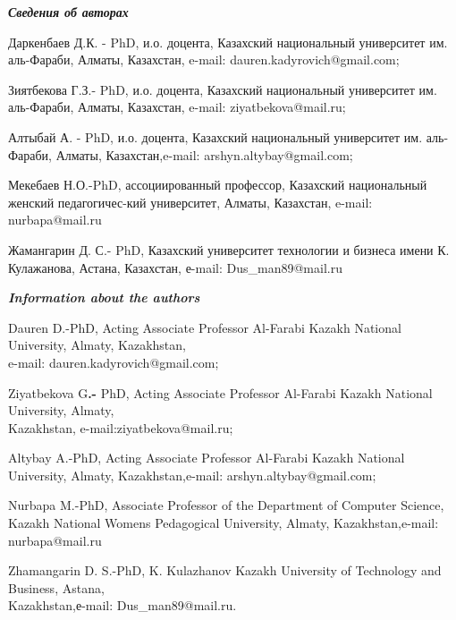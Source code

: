 \begin{noparindent}

\emph{{\bfseries Сведения об авторах}}

Даркенбаев Д.К. - PhD, и.о. доцента, Казахский национальный университет
им. аль-Фараби, Алматы, Казахстан, e-mail: dauren.kadyrovich@gmail.com;

Зиятбекова Г.З.- PhD, и.о. доцента, Казахский национальный университет
им. аль-Фараби, Алматы, Казахстан, e-mail: ziyatbekova@mail.ru;

Алтыбай А. - PhD, и.о. доцента, Казахский национальный университет им.
аль-Фараби, Алматы, Казахстан,e-mail: arshyn.altybay@gmail.com;

Мекебаев Н.О.-PhD, ассоциированный профессор, Казахский национальный
женский педагогичес-кий университет, Алматы, Казахстан, e-mail:
nurbapa@mail.ru

Жамангарин Д. С.- PhD, Казахский университет технологии и бизнеса имени
К. Кулажанова, Астана, Казахстан, е-mail: Dus\_man89@mail.ru
\end{noparindent}



\emph{{\bfseries Information about the authors}}

\begin{noparindent}

Dauren D.-PhD, Acting Associate Professor Al-Farabi Kazakh National
University, Almaty, Kazakhstan, 
\\e-mail: dauren.kadyrovich@gmail.com;

Ziyatbekova G{\bfseries .-} PhD, Acting Associate Professor Al-Farabi
Kazakh National University, Almaty,\\ Kazakhstan,
e-mail:ziyatbekova@mail.ru;

Altybay A.-PhD, Acting Associate Professor Al-Farabi Kazakh National
University, Almaty, Kazakhstan,e-mail: arshyn.altybay@gmail.com;

Nurbapa M.-PhD, Associate Professor of the Department of Computer
Science, Kazakh National Women\textquotesingle s Pedagogical University,
Almaty, Kazakhstan,e-mail: nurbapa@mail.ru

Zhamangarin D. S.-PhD, K. Kulazhanov Kazakh University of Technology and
Business, Astana, \\Kazakhstan,е-mail: Dus\_man89@mail.ru.
\end{noparindent}
